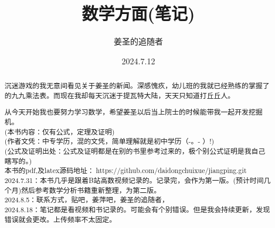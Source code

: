 \title{数学方面(笔记)} %
\author{姜圣的追随者}  %
\date{2024.7.12} %

\maketitle %
\newpage
\begin{abstract}
    沉迷游戏的我无意间看见关于姜圣的新闻。深感愧疚，幼儿班的我就已经熟练的掌握了的九九乘法表。而现在我却每天沉迷于提瓦特大陆，天天只知道打丘丘人。\par 从今天开始我也要努力学习数学，希望姜圣以后当上院士的时候能带我一起开发挖掘机。
    \\(本书内容：仅有公式，定理及证明)
    \\(作者文凭：中专学历，混的文凭，简单理解就是初中学历（-。- ）!)
    \\(公式及证明出处：公式及证明都是在别的书里参考过来的，极个别公式证明是我自己瞎写的。)
    \\本书的pdf,及latex源码地址：\faGithub $\ $https://github.com/daidongchuixue/jiangping.git
    \\2024.7.31：本书几乎是跟着B站高数视频记录的。记录完，会作为第一版。(预计时间几个月)然后参考数学分析书籍重新整理，为第二版。
    \\2024.8.5：联系方式，贴吧，姜萍吧，姜圣的追随者，
    \\2024.8.18：笔记都是看视频和书记录的。可能会有个别错误。但是我会持续更新，发现错误就会更改。上传频率不太固定。
\end{abstract}
\newpage
\renewcommand{\contentsname}{\begin{center}目录\end{center} }
\tableofcontents %




